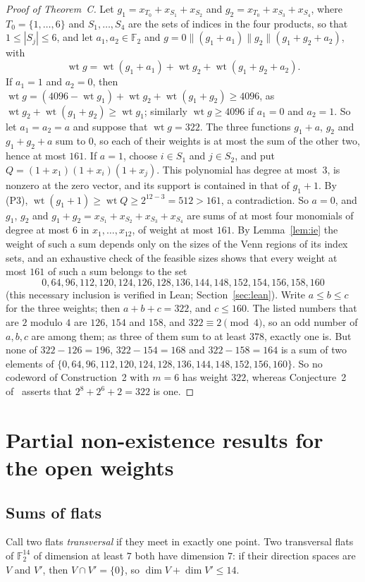 \documentclass[11pt]{article}
\theoremstyle{remark}
\newcommand{\F}{\mathbb F}
\DeclareMathOperator{\wt}{wt}
\newcommand{\cat}{\mathbin{\|}}
\begin{document}
\begin{proof}[Proof of Theorem~C]
Let $g_1=x_{T_0}+x_{S_1}+x_{S_2}$ and $g_2=x_{T_0}+x_{S_3}+x_{S_4}$, where
$T_0=\{1,\dots,6\}$ and $S_1,\dots,S_4$ are the sets of indices in the four
products, so that $1\le|S_j|\le6$, and let $a_1,a_2\in\F_2$ and
$g=0\cat(g_1+a_1)\cat g_2\cat(g_1+g_2+a_2)$, with
\[
\wt g=\wt(g_1+a_1)+\wt g_2+\wt(g_1+g_2+a_2).
\]
If $a_1=1$ and $a_2=0$, then $\wt g=(4096-\wt g_1)+\wt g_2+\wt(g_1+g_2)\ge4096$,
as $\wt g_2+\wt(g_1+g_2)\ge\wt g_1$; similarly $\wt g\ge4096$ if $a_1=0$ and
$a_2=1$. So let $a_1=a_2=a$ and suppose that $\wt g=322$. The three functions
$g_1+a$, $g_2$ and $g_1+g_2+a$ sum to $0$, so each of their weights is at most
the sum of the other two, hence at most $161$. If $a=1$, choose $i\in S_1$
and $j\in S_2$, and put $Q=(1+x_1)(1+x_i)(1+x_j)$. This polynomial has
degree at most~$3$, is nonzero at the zero vector, and its support is
contained in that of $g_1+1$. By (P3), $\wt(g_1+1)\ge\wt Q\ge2^{12-3}=512>161$,
a contradiction. So $a=0$, and $g_1$, $g_2$ and
$g_1+g_2=x_{S_1}+x_{S_2}+x_{S_3}+x_{S_4}$ are sums of at most four monomials of
degree at most $6$ in $x_1,\dots,x_{12}$, of weight at most $161$. By
Lemma~\ref{lem:ie} the weight of such a sum depends only on the sizes of the
Venn regions of its index sets, and an exhaustive check of the feasible sizes
shows that every weight at most $161$ of such a sum belongs to the set
\[
0,64,96,112,120,124,126,128,136,144,148,152,154,156,158,160
\]
(this necessary inclusion is verified in Lean; Section~\ref{sec:lean}). Write
$a\le b\le c$ for the three weights; then $a+b+c=322$, and $c\le160$. The
listed numbers that are $2$ modulo $4$ are $126$, $154$ and $158$, and
$322\equiv2\pmod4$, so an odd number of $a,b,c$ are among them; as three of them
sum to at least $378$, exactly one is. But none of $322-126=196$,
$322-154=168$ and $322-158=164$ is a sum of two elements of
$\{0,64,96,112,120,124,128,136,144,148,152,156,160\}$. So no codeword of
Construction~2 with $m=6$ has weight $322$, whereas Conjecture~2 of~\cite{lw}
asserts that $2^8+2^6+2=322$ is one.
\end{proof}

\section{Partial non-existence results for the open weights}\label{sec:nonex}

\subsection{Sums of flats}
Call two flats \emph{transversal} if they meet in exactly one point. Two
transversal flats of $\F_2^{14}$ of dimension at least $7$ both have dimension
$7$: if their direction spaces are $V$ and $V'$, then $V\cap V'=\{0\}$, so
$\dim V+\dim V'\le14$.
\end{document}
